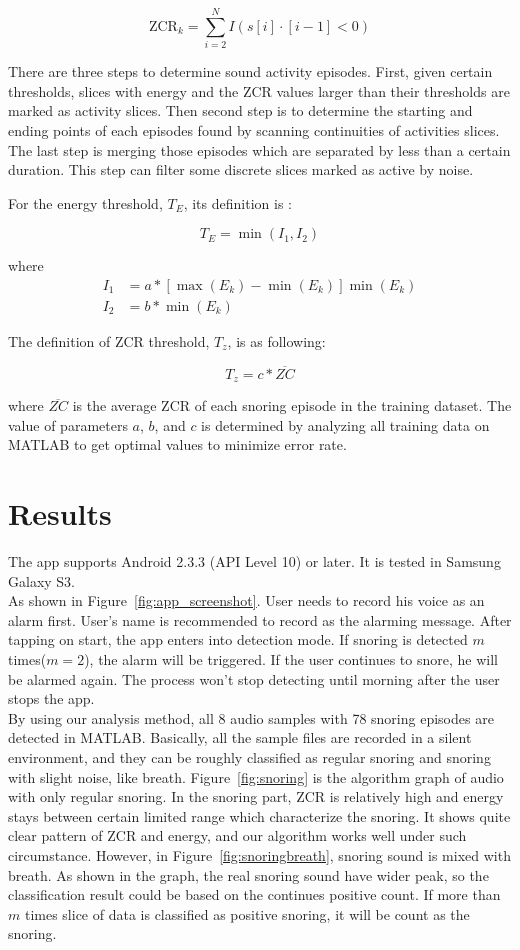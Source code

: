 \documentclass[conference]{IEEEtran}
\begin{document}
$$ \text{ZCR}_k = \sum_{i=2}^{N}I(s[i]\cdot[i-1]<0)$$

There are three steps to determine sound activity episodes. First, given certain thresholds, slices with energy and the ZCR values larger than their thresholds are marked as activity slices. Then second step is to determine the starting and ending points of each episodes  found by scanning continuities of activities slices. The last step is merging those episodes which are separated by less than a certain duration. This step can filter some discrete slices marked as active by noise. 

For the energy threshold, $T_E$, its definition is :

$$T_E=\min(I_1, I_2)$$

where 
$$
\begin{aligned}
I_1&=a*[\max(E_k)-\min(E_k)]\min(E_k)\\
I_2&=b*\min(E_k)
\end{aligned}$$

The definition of ZCR threshold, $T_z$, is as following:

$$T_z = c*\overline{ZC}$$

where $\overline{ZC}$ is the average ZCR of each snoring episode in the training dataset. The value of parameters $a$, $b$, and $c$ is determined by analyzing all training data on MATLAB to get optimal values to minimize error rate.


\section{Results} %
\label{sec:results}

The app supports Android 2.3.3 (API Level 10) or later. It is tested in Samsung Galaxy S3.\\

As shown in Figure~\ref{fig:app_screenshot}. User needs to record his voice as an alarm first. User's name is recommended to record as the alarming message. After tapping on start, the app enters into detection mode. If snoring is detected $m$ times($ m = 2 $), the alarm will be triggered. If the user continues to snore, he will be alarmed again. The process won't stop detecting until morning after the user stops the app.\\

By using our analysis method, all 8 audio samples with 78 snoring episodes are detected in MATLAB. Basically, all the sample files are recorded in a silent environment, and they can be roughly classified as regular snoring and snoring with slight noise, like breath. Figure~\ref{fig:snoring} is the algorithm graph of audio with only regular snoring. In the snoring part, ZCR is relatively high and energy stays between certain limited range which characterize the snoring. It shows quite clear pattern of ZCR and energy, and our algorithm works well under such circumstance. However, in Figure~\ref{fig:snoringbreath}, snoring sound is mixed with breath. As shown in the graph, the real snoring sound have wider peak, so the classification result could be based on the continues positive count. If more than $m$ times slice of data is classified as positive snoring, it will be count as the snoring. \\
\end{document}
